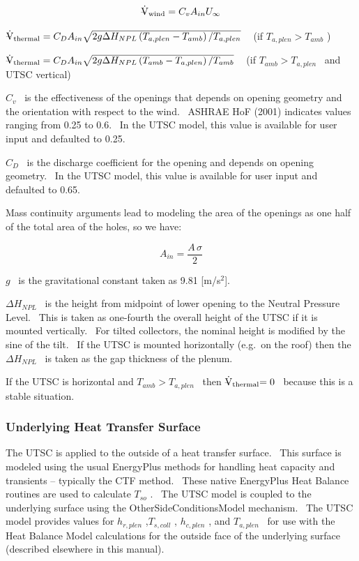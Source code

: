 \begin{equation}
{{\rm{\rlap{--} \dot V}}_{{\rm{wind}}}} = {C_v}{A_{in}}{U_\infty }
\end{equation}

\({{\rm{\rlap{--} \dot V}}_{{\rm{thermal}}}} = {C_D}{A_{in}}\sqrt {2g\Delta {H_{NPL}}\left( {{T_{a,plen}} - {T_{amb}}} \right)/{T_{a,plen}}}\) ~ (if \({T_{a,plen}} > {T_{amb}}\) )

\({{\rm{\rlap{--} \dot V}}_{{\rm{thermal}}}} = {C_D}{A_{in}}\sqrt {2g\Delta {H_{NPL}}\left( {{T_{amb}} - {T_{a,plen}}} \right)/{T_{amb}}}\) ~ (if \({T_{amb}} > {T_{a,plen}}\) ~and UTSC vertical)

\({C_v}\) ~is the effectiveness of the openings that depends on opening geometry and the orientation with respect to the wind.~ ASHRAE HoF (2001) indicates values ranging from 0.25 to 0.6.~ In the UTSC model, this value is available for user input and defaulted to 0.25.

\({C_D}\) ~is the discharge coefficient for the opening and depends on opening geometry.~ In the UTSC model, this value is available for user input and defaulted to 0.65.

Mass continuity arguments lead to modeling the area of the openings as one half of the total area of the holes, so we have:

\begin{equation}
{A_{in}} = \frac{{A\,\sigma }}{2}
\end{equation}

\(g\) ~is the gravitational constant taken as 9.81 {[}m/s\(^{2}\){]}.

\(\Delta {H_{NPL}}\) ~is the height from midpoint of lower opening to the Neutral Pressure Level.~ This is taken as one-fourth the overall height of the UTSC if it is mounted vertically.~ For tilted collectors, the nominal height is modified by the sine of the tilt.~ If the UTSC is mounted horizontally (e.g.~on the roof) then the \(\Delta {H_{NPL}}\) ~is taken as the gap thickness of the plenum.

If the UTSC is horizontal and \({T_{amb}} > {T_{a,plen}}\) ~then \({{\rm{\rlap{--} \dot V}}_{{\rm{thermal}}}}{\rm{ = 0}}\) ~because this is a stable situation.

\subsubsection{Underlying Heat Transfer Surface}\label{underlying-heat-transfer-surface-000}

The UTSC is applied to the outside of a heat transfer surface.~ This surface is modeled using the usual EnergyPlus methods for handling heat capacity and transients -- typically the CTF method.~ These native EnergyPlus Heat Balance routines are used to calculate \({T_{so}}\) .~ The UTSC model is coupled to the underlying surface using the OtherSideConditionsModel mechanism.~ The UTSC model provides values for \({h_{r,plen}}\) ,\({T_{s,coll}}\) , \({h_{c,plen}}\) , and \({T_{a,plen}}\) ~for use with the Heat Balance Model calculations for the outside face of the underlying surface (described elsewhere in this manual).

